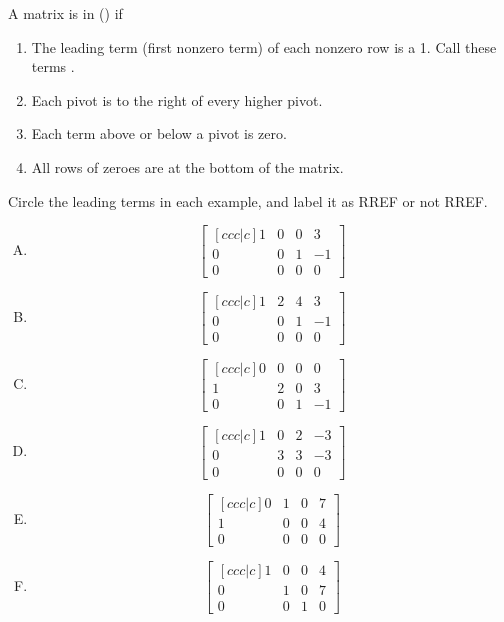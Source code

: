 \begin{activity}{10}
A matrix is in  () if
\begin{enumerate}
\item The leading term (first nonzero term) of each nonzero row is a 1.
      Call these terms .
\item Each pivot is to the right of every higher pivot.
\item Each term above or below a pivot is zero.
\item All rows of zeroes are at the bottom of the matrix.
\end{enumerate}

Circle the leading terms in each example, and label it as RREF or not RREF.
\begin{multicols}{3}
\begin{enumerate}[(A)]
\item \[ \begin{bmatrix}[ccc|c] 1 & 0 & 0 & 3 \\ 0 & 0 & 1 & -1 \\ 0 & 0 & 0 & 0 \end{bmatrix}\]
\item \[ \begin{bmatrix}[ccc|c] 1 & 2 & 4 & 3 \\ 0 & 0 & 1 & -1 \\ 0 & 0 & 0 & 0 \end{bmatrix}\]
\item \[ \begin{bmatrix}[ccc|c] 0 & 0 & 0 & 0 \\ 1 & 2 & 0 & 3 \\ 0 & 0 & 1 & -1  \end{bmatrix}\]
\item \[ \begin{bmatrix}[ccc|c] 1 & 0 & 2 & -3 \\ 0 & 3 & 3 & -3 \\ 0 & 0 & 0 & 0 \end{bmatrix}\]
\item \[ \begin{bmatrix}[ccc|c] 0 & 1 & 0 & 7 \\ 1 & 0 & 0 & 4 \\ 0 & 0 & 0 & 0 \end{bmatrix}\]
\item \[ \begin{bmatrix}[ccc|c] 1 & 0 & 0 & 4 \\ 0 & 1 & 0 & 7 \\ 0 & 0 & 1 & 0 \end{bmatrix}\]
\end{enumerate}
\end{multicols}
\end{activity}

